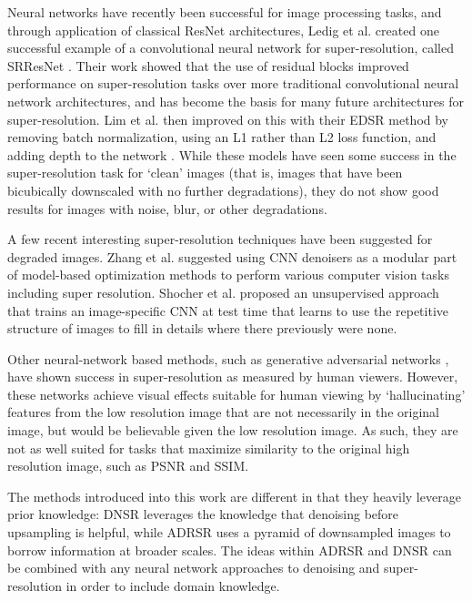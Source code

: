 \documentclass[10pt,twocolumn,letterpaper]{article}
\begin{document}
Neural networks have recently been successful for image processing tasks, and through application of classical ResNet architectures, Ledig et al$.$  created one successful example of a convolutional neural network for super-resolution, called SRResNet \cite{LEDIG}. Their work showed that the use of residual blocks improved performance on super-resolution tasks over more traditional convolutional neural network architectures, and has become the basis for many future architectures for super-resolution. Lim et al$.$ then improved on this with their EDSR method by removing batch normalization, using an L1 rather than L2 loss function, and adding depth to the network \cite{EDSR}. While these models have seen some success in the super-resolution task for `clean' images (that is, images that have been bicubically downscaled with no further degradations), they do not show good results for images with noise, blur, or other degradations. 

A few recent interesting super-resolution techniques have been suggested for degraded images. Zhang et al$.$ \cite{IRCNN} suggested using CNN denoisers as a modular part of model-based optimization methods to perform various computer vision tasks including super resolution. Shocher et al$.$ \cite{zssr} proposed an unsupervised approach that trains an image-specific CNN at test time that learns to use the repetitive structure of images to fill in details where there previously were none.

Other neural-network based methods, such as generative adversarial networks \cite{LEDIG}, have shown success in super-resolution as measured by human viewers. However, these networks achieve visual effects suitable for human viewing by `hallucinating' features from the low resolution image that are not necessarily in the original image, but would be believable given the low resolution image. As such, they are not as well suited for tasks that maximize similarity to the original high resolution image, such as PSNR and SSIM.

The methods introduced into this work are different in that they heavily leverage prior knowledge: DNSR leverages the knowledge that denoising before upsampling is helpful, while ADRSR uses a pyramid of downsampled images to borrow information at broader scales. The ideas within ADRSR and DNSR can be combined with any neural network approaches to denoising and super-resolution in order to include domain knowledge.
\end{document}
